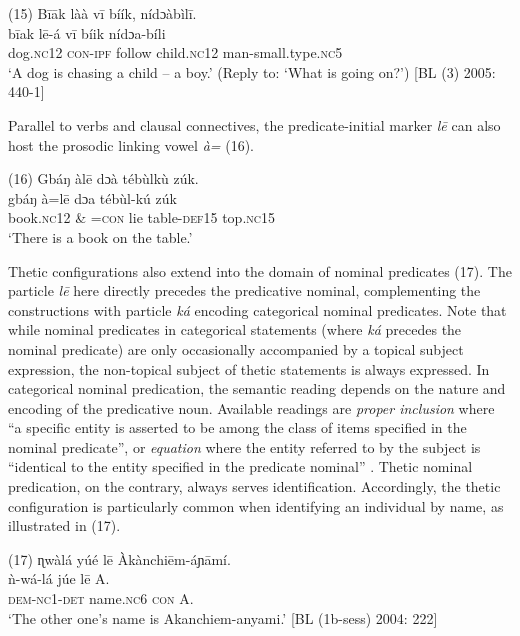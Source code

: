 \documentclass[output=paper]{langsci/langscibook}
\begin{document}
\ea
\glll \textup{(15)}  B\={i}\={a}k    làà    v\={i}  bíík,    nídɔàbìl\={i}.\\
  \textup{  b\={i}ak    l\={e}-á    v\={i}  bíik    nídɔa-bíli}\\
       dog.\textsc{nc}12  \textsc{con}{}-\textsc{ipf}  follow  child.\textsc{nc}12  man-small.type.\textsc{nc}5\\
\glt ‘A dog is chasing a child – a boy.’ (Reply to: ‘What is going on?’) [BL (3) 2005: 440-1]
\z

Parallel to verbs and clausal connectives, the predicate-initial marker \textit{l\={e} }can also host the prosodic linking vowel \textit{à}\textit{=} (16).

\ea
\glll \textup{(16)}  Gbáŋ    àl\={e}    dɔà  tébùlkù    zúk.\\
  \textup{  gbáŋ    à=l\={e}    dɔa  tébùl-kú  zúk}\\
       book.\textsc{nc}12   \& =\textsc{con}  lie  table-\textsc{def}15  top.\textsc{nc}15\\
\glt ‘There is a book on the table.’ \citep[271]{Schwarz2009}
\z

Thetic configurations also extend into the domain of nominal predicates (17). The particle \textit{l\={e} }here directly precedes the predicative nominal, complementing the constructions with particle \textit{ká }encoding categorical nominal predicates. Note that while nominal predicates in categorical statements (where \textit{ká }precedes the nominal predicate) are only occasionally accompanied by a topical subject expression, the non-topical subject of thetic statements is always expressed. In categorical nominal predication, the semantic reading depends on the nature and encoding of the predicative noun. Available readings are \textit{proper inclusion} where “a specific entity is asserted to be among the class of items specified in the nominal predicate”, or \textit{equation} where the entity referred to by the subject is “identical to the entity specified in the predicate nominal” \citep[114]{Payne1997}. Thetic nominal predication, on the contrary, always serves identification. Accordingly, the thetic configuration is particularly common when identifying an individual by name, as illustrated in (17).

\ea
\glll \textup{(17)}  ɳwàlá     yúé    l\={e}   Àkànchi\={e}m-áɲ\={a}mí.\\
  \textup{  ǹ}\textup{{}-wá-lá   júe    l\={e}   A.}\\
     \textsc{  }\textsc{dem}{}-\textsc{nc}1-\textsc{det  }name\textsc{.nc}6  \textsc{con}  A.\\
\glt ‘The other one’s name is Akanchiem-anyami.’ [BL (1b-sess) 2004: 222]
\z
\end{document}

